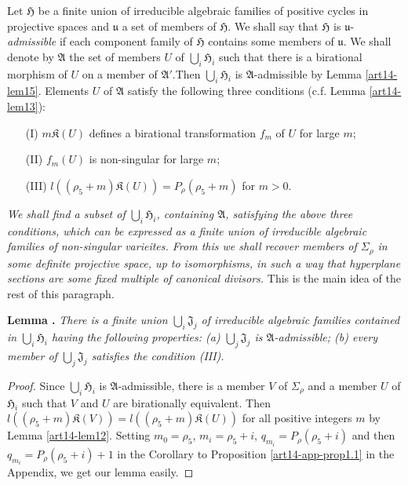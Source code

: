 Let $\mathfrak{H}$ be a finite union of irreducible algebraic families of positive cycles in projective spaces and $\mathfrak{u}$ a set of members of $\mathfrak{H}$. We shall say that $\mathfrak{H}$ is $\mathfrak{u}$-{\em admissible} if each component family of $\mathfrak{H}$ contains some members of $\mathfrak{u}$. We shall denote by $\mathfrak{A}$ the set of members $U$ of $\bigcup_{i}\mathfrak{H}_{i}$ such that there is a birational morphism of $U$ on a member of $\mathfrak{A}'$.\pageoriginale Then $\bigcup_{i}\mathfrak{H}_{i}$ is $\mathfrak{A}$-admissible by Lemma \ref{art14-lem15}. Elements $U$ of $\mathfrak{A}$ satisfy the following three conditions (c.f. Lemma \ref{art14-lem13}):
\begin{itemize}
\item[(I)] $m\mathfrak{K}(U)$ defines a birational transformation $f_{m}$ of $U$ for large $m$; 

\item[(II)] $f_{m}(U)$ is non-singular for large $m$;

\item[(III)] $l((\rho_{5}+m)\mathfrak{K}(U))=P_{\rho}(\rho_{5}+m)$ for $m>0$.
\end{itemize}
{\em We shall find a subset of $\bigcup_{i}\mathfrak{H}_{i}$, containing $\mathfrak{A}$, satisfying the above three conditions, which can be expressed as a finite union of irreducible algebraic families of non-singular varieites. From this we shall recover members of $\Sigma_{\rho}$ in some definite projective space, up to isomorphisms, in such a way that hyperplane sections are some fixed multiple of canonical divisors.} This is the main idea of the rest of this paragraph.

\medskip
\noindent
{\bf Lemma .\label{art14-lem16}}
{\em There is a finite union $\bigcup_{i}\mathfrak{J}_{j}$ of irreducible algebraic families contained in $\bigcup_{i}\mathfrak{H}_{i}$ having the following properties: {\rm(a)} $\bigcup_{j}\mathfrak{J}_{j}$ is $\mathfrak{A}$-admissible; {\rm(b)} every member of $\bigcup_{j}\mathfrak{J}_{j}$ satisfies the condition {\rm(III)}.}

\begin{proof}
Since $\bigcup_{i}\mathfrak{H}_{i}$ is $\mathfrak{A}$-admissible, there is a member $V$ of $\Sigma_{\rho}$ and a member $U$ of $\mathfrak{H}_{i}$ such that $V$ and $U$ are birationally equivalent. Then $l((\rho_{5}+m)\mathfrak{K}(V))=l((\rho_{5}+m)\mathfrak{K}(U))$ for all positive integers $m$ by Lemma \ref{art14-lem12}. Setting $m_{0}=\rho_{5}$, $m_{i}=\rho_{5}+i$, $q_{m_{i}}=P_{\rho}(\rho_{5}+i)$ and then $q_{m_{i}}=P_{\rho}(\rho_{5}+i)+1$ in the Corollary to Proposition \ref{art14-app-prop1.1} in the Appendix, we get our lemma easily.
\end{proof}

